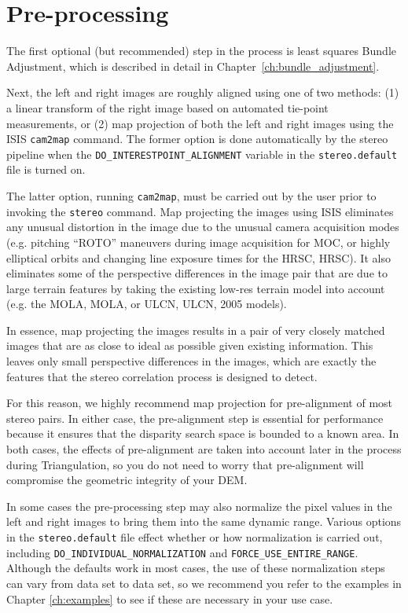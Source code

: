 \section{Pre-processing}

The first optional (but recommended) step in the process is least
squares Bundle Adjustment, which is described in detail in
Chapter~\ref{ch:bundle_adjustment}. 

Next, the left and right images are roughly aligned using one of
two methods: (1) a linear transform of the right image based on
automated tie-point measurements, or (2) map projection of both the
left and right images using the \ac{ISIS} \texttt{cam2map} command.  The
former option is done automatically by the stereo pipeline when the
\texttt{DO\_INTERESTPOINT\_ALIGNMENT} variable in the
\texttt{stereo.default} file is turned on.

The latter option, running {\tt cam2map}, must be carried out by
the user prior to invoking the {\tt stereo} command.  Map projecting
the images using \ac{ISIS} eliminates any unusual distortion in the
image due to the unusual camera acquisition modes (e.g. pitching
``ROTO'' maneuvers during image acquisition for \ac{MOC}, or highly
elliptical orbits and changing line exposure times for the \acl{HRSC},
\acs{HRSC}).  It also eliminates some of the perspective differences
in the image pair that are due to large terrain features by taking
the existing low-res terrain model into account (e.g. the \acl{MOLA},
\acs{MOLA}, or \acl{ULCN}, \acs{ULCN}, 2005 models).

In essence, map projecting the images results in a pair of very
closely matched images that are as close to ideal as possible given
existing information.  This leaves only small perspective differences
in the images, which are exactly the features that the stereo
correlation process is designed to detect.  

For this reason, we highly recommend map projection for pre-alignment
of most stereo pairs.  In either case, the pre-alignment step is
essential for performance because it ensures that the disparity search
space is bounded to a known area.  In both cases, the effects of
pre-alignment are taken into account later in the process during
Triangulation, so you do not need to worry that pre-alignment will
compromise the geometric integrity of your \ac{DEM}.

In some cases the pre-processing step may also normalize the pixel
values in the left and right images to bring them into the same
dynamic range.  Various options in the {\tt stereo.default} file
effect whether or how normalization is carried out, including
\texttt{DO\_INDIVIDUAL\_NORMALIZATION} and
\texttt{FORCE\_USE\_ENTIRE\_RANGE}.  Although the defaults work in
most cases, the use of these normalization steps can vary from data
set to data set, so we recommend you refer to the examples in Chapter
\ref{ch:examples} to see if these are necessary in your use case.

